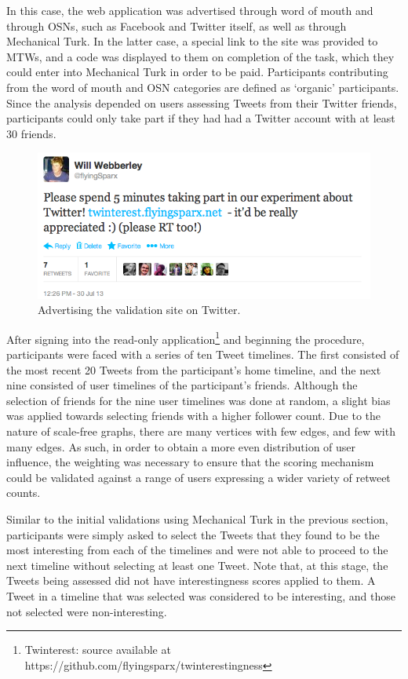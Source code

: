 In this case, the web application was advertised through word of mouth and through OSNs, such as Facebook and Twitter itself, as well as through Mechanical Turk. In the latter case, a special link to the site was provided to MTWs, and a code was displayed to them on completion of the task, which they could enter into Mechanical Turk in order to be paid. Participants contributing from the word of mouth and OSN categories are defined as `organic' participants. Since the analysis depended on users assessing Tweets from their Twitter friends, participants could only take part if they had had a Twitter account with at least 30 friends.

\begin{figure}[h]
\centering
\includegraphics[scale=0.5]{5.Chapter3/Media/organic_advertising.png} 
\caption{Advertising the validation site on Twitter.}
\label{fig:organic_advertising}
\end{figure}

After signing into the read-only application\footnote{Twinterest: source available at https://github.com/flyingsparx/twinterestingness} and beginning the procedure, participants were faced with a series of ten Tweet timelines. The first consisted of the most recent 20 Tweets from the participant's home timeline, and the next nine consisted of user timelines of the participant's friends. Although the selection of friends for the nine user timelines was done at random, a slight bias was applied towards selecting friends with a higher follower count. Due to the nature of scale-free graphs, there are many vertices with few edges, and few with many edges. As such, in order to obtain a more even distribution of user influence, the weighting was necessary to ensure that the scoring mechanism could be validated against a range of users expressing a wider variety of retweet counts.

Similar to the initial validations using Mechanical Turk in the previous section, participants were simply asked to select the Tweets that they found to be the most interesting from each of the timelines and were not able to proceed to the next timeline without selecting at least one Tweet. Note that, at this stage, the Tweets being assessed did not have interestingness scores applied to them. A Tweet in a timeline that was selected was considered to be interesting, and those not selected were non-interesting.


